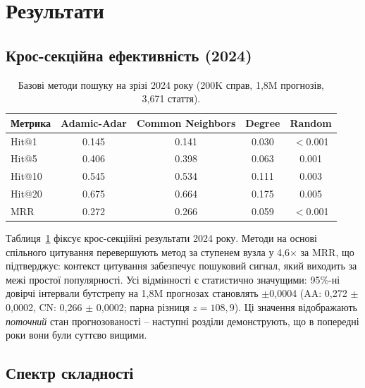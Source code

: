 \section{Результати}
\label{sec:results}

\subsection{Крос-секційна ефективність (2024)}

\begin{table}[t]
\centering
\small
\caption{Базові методи пошуку на зрізі 2024 року (200K справ, 1,8M прогнозів, 3{,}671 стаття).}
\label{tab:main}
\begin{tabular}{@{}l cccc@{}}
\toprule
\textbf{Метрика} & \textbf{Adamic-Adar} & \textbf{Common Neighbors} & \textbf{Degree} & \textbf{Random} \\
\midrule
Hit@1  & 0.145 & 0.141 & 0.030 & $<$0.001 \\
Hit@5  & 0.406 & 0.398 & 0.063 & 0.001 \\
Hit@10 & 0.545 & 0.534 & 0.111 & 0.003 \\
Hit@20 & 0.675 & 0.664 & 0.175 & 0.005 \\
MRR    & 0.272 & 0.266 & 0.059 & $<$0.001 \\
\bottomrule
\end{tabular}
\end{table}

Таблиця~\ref{tab:main} фіксує крос-секційні результати 2024 року.
Методи на основі спільного цитування перевершують метод за ступенем вузла у 4,6$\times$ за MRR, що підтверджує: контекст цитування забезпечує пошуковий сигнал, який виходить за межі простої популярності.
Усі відмінності є статистично значущими: 95\%-ні довірчі інтервали бутстрепу на 1,8M прогнозах становлять $\pm$0,0004 (AA: 0,272 $\pm$ 0,0002, CN: 0,266 $\pm$ 0,0002; парна різниця $z = 108{,}9$).
Ці значення відображають \emph{поточний} стан прогнозованості -- наступні розділи демонструють, що в попередні роки вони були суттєво вищими.

\subsection{Спектр складності}

